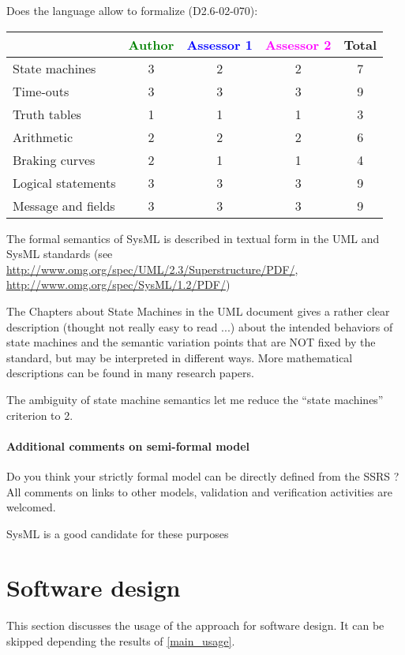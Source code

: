 Does the language allow to formalize (D2.6-02-070):

\begin{tabular}{|l | c | c | c | c|}
\hline
& \textcolor{green}{Author} & \textcolor{blue}{Assessor 1} & \textcolor{magenta}{Assessor 2} & Total \\
\hline 
State machines  &3 & 2& 2& 7 \\
\hline
Time-outs  &3 & 3& 3& 9 \\
\hline
Truth tables  &1 & 1& 1& 3 \\
\hline
Arithmetic  & 2& 2& 2& 6 \\
\hline
Braking curves  &2 & 1& 1& 4 \\
\hline
Logical statements &3 & 3& 3& 9 \\
\hline
Message and fields &3 & 3& 3& 9 \\
\hline
\end{tabular}
\begin{author_comment}

The formal semantics of SysML is described in textual form in the UML and SysML standards
(see \url{http://www.omg.org/spec/UML/2.3/Superstructure/PDF/}, \url{http://www.omg.org/spec/SysML/1.2/PDF/})

The Chapters about State Machines in the UML
document gives a rather clear description (thought not really easy
to read ...) about the intended behaviors of state machines and the
semantic variation points that are NOT fixed by the standard, but may
be interpreted in different ways. More mathematical descriptions can
be found in  many research papers.
\end{author_comment}

\begin{assessor1}
The ambiguity of state machine semantics let me reduce the "`state machines"' criterion to 2. 
\end{assessor1}


\paragraph{Additional comments on semi-formal  model} Do you think your strictly formal  model can be directly defined from the SSRS ?
All comments on links to  other models, validation and verification activities are welcomed.

\begin{author_comment}
SysML is a good candidate for these purposes
\end{author_comment}
\section{Software design}
This section discusses the usage of the approach for software design.
It can be skipped depending the results of \ref{main_usage}.

